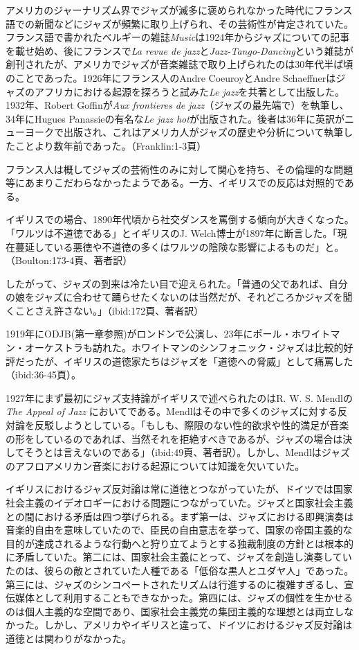 アメリカのジャーナリズム界でジャズが滅多に褒められなかった時代にフランス語での新聞などにジャズが頻繁に取り上げられ、その芸術性が肯定されていた。フランス語で書かれたベルギーの雑誌\textit{Music}は1924年からジャズについての記事を載せ始め、後にフランスで\textit{La revue de jazz}と\textit{Jazz-Tango-Dancing}という雑誌が創刊されたが、アメリカでジャズが音楽雑誌で取り上げられたのは30年代半ば頃のことであった。1926年にフランス人のAndre CoeuroyとAndre Schaeffnerはジャズのアフリカにおける起源を探ろうと試みた\textit{Le jazz}を共著として出版した。1932年、Robert Goffinが\textit{Aux frontieres de jazz}（ジャズの最先端で）を執筆し、34年にHugues Panassieの有名な\textit{Le jazz hot}が出版された。後者は36年に英訳がニューヨークで出版され、これはアメリカ人がジャズの歴史や分析について執筆したことより数年前であった。（Franklin:1-3頁）

フランス人は概してジャズの芸術性のみに対して関心を持ち、その倫理的な問題等にあまりこだわらなかったようである。一方、イギリスでの反応は対照的である。

イギリスでの場合、1890年代頃から社交ダンスを罵倒する傾向が大きくなった。「ワルツは不道徳である」とイギリスのJ. Welch博士が1897年に断言した。「現在蔓延している悪徳や不道徳の多くはワルツの陰険な影響によるものだ」と。（Boulton:173-4頁、著者訳）

したがって、ジャズの到来は冷たい目で迎えられた。「普通の父であれば、自分の娘をジャズに合わせて踊らせたくないのは当然だが、それどころかジャズを聞くことさえ許さない。」（ibid:172頁、著者訳）

1919年にODJB(第一章参照)がロンドンで公演し、23年にポール・ホワイトマン・オーケストラも訪れた。ホワイトマンのシンフォニック・ジャズは比較的好評だったが、イギリスの道徳家たちはジャズを「道徳への脅威」として痛罵した（ibid:36-45頁）。

1927年にまず最初にジャズ支持論がイギリスで述べられたのはR. W. S. Mendlの \textit{The Appeal of Jazz} においてである。Mendlはその中で多くのジャズに対する反対論を反駁しようとしている。「もしも、際限のない性的欲求や性的満足が音楽の形をしているのであれば、当然それを拒絶すべきであるが、ジャズの場合は決してそうとは言えないのである」（ibid:49頁、著者訳）。しかし、Mendlはジャズのアフロアメリカン音楽における起源については知識を欠いていた。

イギリスにおけるジャズ反対論は常に道徳とつながっていたが、ドイツでは国家社会主義のイデオロギーにおける問題につながっていた。ジャズと国家社会主義との間における矛盾は四つ挙げられる。まず第一は、ジャズにおける即興演奏は音楽的自由を意味していたので、臣民の自由意志を挙って、国家の帝国主義的な目的が達成されるような行動へと狩り立てようとする独裁制度の方針とは根本的に矛盾していた。第二には、国家社会主義にとって、ジャズを創造し演奏していたのは、彼らの敵とされていた人種である「低俗な黒人とユダヤ人」であった。第三には、ジャズのシンコペートされたリズムは行進するのに複雑すぎるし、宣伝媒体として利用することもできなかった。第四には、ジャズの個性を生かせるのは個人主義的な空間であり、国家社会主義党の集団主義的な理想とは両立しなかった。しかし、アメリカやイギリスと違って、ドイツにおけるジャズ反対論は道徳とは関わりがなかった。

